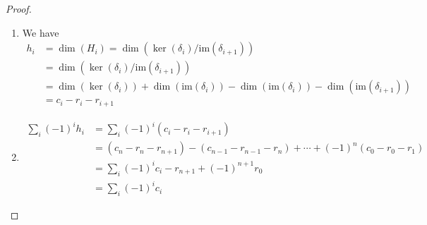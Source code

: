 \documentclass[12pt]{extarticle}
\newcommand{\im}{\text{im}}
\newcommand{\<}{\langle}
\renewcommand{\>}{\rangle}
\theoremstyle{definition}
\begin{document}
\begin{proof}
  \begin{enumerate}
  \item
    We have 
    \begin{align*}
      h_i
      &= \dim(H_i) = \dim (\ker(\delta_i)/\im(\delta_{i+1})) \\
      &= \dim (\ker(\delta_i)/\im(\delta_{i+1})) \\
      &= \dim (\ker(\delta_i)) + \dim(\im(\delta_i)) - \dim(\im(\delta_i)) - \dim(\im(\delta_{i+1}))  \\
      &=  c_i - r_i - r_{i+1}
    \end{align*}
  \item
    \begin{align*}
      \sum\limits_i (-1)^i h_i &= \sum\limits_i (-1)^i (c_i - r_i - r_{i+1})  \\
      &= (c_n - r_n - r_{n+1}) - (c_{n-1} - r_{n-1} - r_n) + \cdots + (-1)^n(c_0 - r_0 - r_1) \\
      &= \sum \limits_i (-1)^i c_i - r_{n+1} + (-1)^{n+1} r_0 \\
      &= \sum \limits_i (-1)^i c_i
    \end{align*}
  \end{enumerate}
\end{proof}
\end{document}
